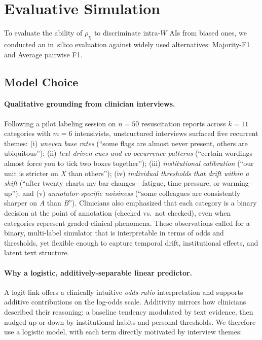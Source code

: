 \documentclass[12pt]{article}
\begin{document}
\section{Evaluative Simulation}
To evaluate the ability of $\rho_{\chi}$ to discriminate intra-$W$ AIs from biased ones, we conducted an in~silico evaluation against widely used alternatives: Majority-F1 and Average pairwise F1.

\subsection{Model Choice}

\paragraph{Qualitative grounding from clinician interviews.}
Following a pilot labeling session on $n=50$ resuscitation reports across $k=11$ categories with $m=6$ intensivists, unstructured interviews surfaced five recurrent themes:
(i) \emph{uneven base rates} (“some flags are almost never present, others are ubiquitous”);
(ii) \emph{text-driven cues and co-occurrence patterns} (“certain wordings almost force you to tick two boxes together”);
(iii) \emph{institutional calibration} (“our unit is stricter on \textit{X} than others”);
(iv) \emph{individual thresholds that drift within a shift} (“after twenty charts my bar changes—fatigue, time pressure, or warming-up”); and
(v) \emph{annotator-specific noisiness} (“some colleagues are consistently sharper on \textit{A} than \textit{B}”).
Clinicians also emphasized that each category is a binary decision at the point of annotation (checked vs.\ not checked), even when categories represent graded clinical phenomena. These observations called for a binary, multi-label simulator that is interpretable in terms of odds and thresholds, yet flexible enough to capture temporal drift, institutional effects, and latent text structure.

\paragraph{Why a logistic, additively-separable linear predictor.}
A logit link offers a clinically intuitive \emph{odds-ratio} interpretation and supports additive contributions on the log-odds scale. Additivity mirrors how clinicians described their reasoning: a baseline tendency modulated by text evidence, then nudged up or down by institutional habits and personal thresholds. We therefore use a logistic model, with each term directly motivated by interview themes:
\end{document}
